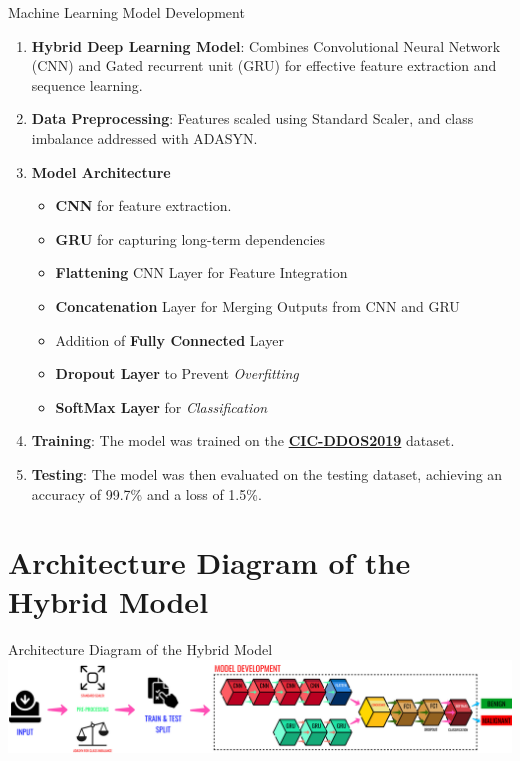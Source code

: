 \documentclass{beamer}
\begin{document}
\begin{frame}{Machine Learning Model Development}
\begin{enumerate}
    \item \textbf{Hybrid Deep Learning Model}: Combines Convolutional Neural Network (CNN) and Gated recurrent unit (GRU) for effective feature extraction and sequence learning.
    \item \textbf{Data Preprocessing}: Features scaled using Standard Scaler, and class imbalance addressed with ADASYN.
    \item \textbf{Model Architecture}
    \begin{itemize}
        \item \textbf{CNN} for feature extraction.
        \item \textbf{GRU} for capturing long-term dependencies
        \item \textbf{Flattening} CNN Layer for Feature Integration
        \item \textbf{Concatenation} Layer for Merging Outputs from CNN and GRU
        \item Addition of \textbf{Fully Connected} Layer
        \item \textbf{Dropout Layer} to Prevent \textit{Overfitting}
        \item \textbf{SoftMax Layer} for \textit{Classification}
    \end{itemize}
    \item \textbf{Training}: The model was trained on the \href{https://www.unb.ca/cic/datasets/ddos-2019.html}{\textbf{CIC-DDOS2019}} dataset.
    \item \textbf{Testing}: The model was then evaluated on the testing dataset, achieving an accuracy of 99.7\% and a loss of 1.5\%.
\end{enumerate}
\end{frame}

\section{Architecture Diagram of the Hybrid Model}

\begin{frame}{Architecture Diagram of the Hybrid Model}
\includegraphics[width=\textwidth]{images/model-arch.png}
\end{frame}
\end{document}
